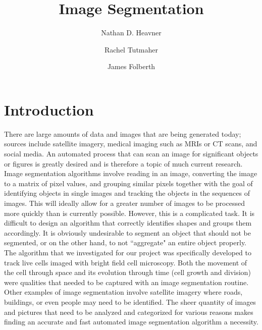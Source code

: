 \documentclass[12pt]{article}%
\date{}
\title{Image Segmentation}
\author{
 Nathan D. Heavner
      \and
  Rachel Tutmaher
  	\and
	James Folberth
}
\begin{document}
\maketitle

\section{Introduction}
There are large amounts of data and images that are being generated today; sources include satellite imagery, medical imaging such as MRIs or CT scans, and social media. An automated process that can scan an image for significant objects or figures is greatly desired and is therefore a topic of much current research. Image segmentation algorithms involve reading in an image, converting the image to a matrix of pixel values, and grouping similar pixels together with the goal of identifying objects in single images and tracking the objects in the sequences of images.  This will ideally allow for a greater number of images to be processed more quickly than is currently possible. However, this is a complicated task.  It is difficult to design an algorithm that correctly identifies shapes and groups them accordingly.  It is obviously undesirable to segment an object that should not be segmented, or on the other hand, to not ``aggregate" an entire object properly. 
\vspace{5mm} \\
The algorithm that we investigated for our project was specifically developed to track live cells imaged with bright field cell microscopy.  Both the movement of the cell through space and its evolution through time (cell growth and division) were qualities that needed to be captured with an image segmentation routine.  Other examples of image segmentation involve satellite imagery where roads, buildings, or even people may need to be identified.  The sheer quantity of images and pictures that need to be analyzed and categorized for various reasons makes finding an accurate and fast automated image segmentation algorithm a necessity.
\vspace{5mm} \\
\end{document}
